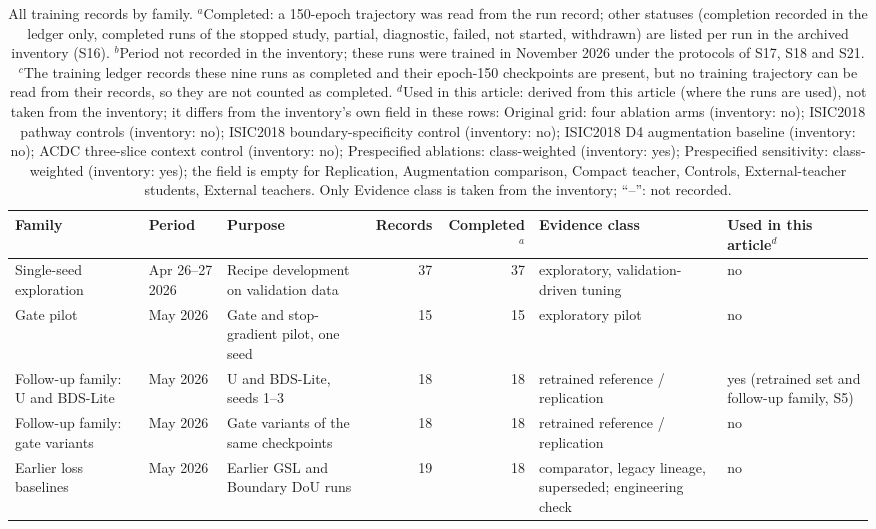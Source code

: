 \begin{longtable}{@{}p{3.0cm}p{1.5cm}p{3.6cm}rrp{2.8cm}p{2.3cm}@{}}
\caption{\label{tab:inventory}All training records by family. $^{a}$Completed: a 150-epoch trajectory was read from the run record; other statuses (completion recorded in the ledger only, completed runs of the stopped study, partial, diagnostic, failed, not started, withdrawn) are listed per run in the archived inventory (S16). $^{b}$Period not recorded in the inventory; these runs were trained in November 2026 under the protocols of S17, S18 and S21. $^{c}$The training ledger records these nine runs as completed and their epoch-150 checkpoints are present, but no training trajectory can be read from their records, so they are not counted as completed. $^{d}$Used in this article: derived from this article (where the runs are used), not taken from the inventory; it differs from the inventory's own field in these rows: Original grid: four ablation arms (inventory: no); ISIC2018 pathway controls (inventory: no); ISIC2018 boundary-specificity control (inventory: no); ISIC2018 D4 augmentation baseline (inventory: no); ACDC three-slice context control (inventory: no); Prespecified ablations: class-weighted (inventory: yes); Prespecified sensitivity: class-weighted (inventory: yes); the field is empty for Replication, Augmentation comparison, Compact teacher, Controls, External-teacher students, External teachers. Only Evidence class is taken from the inventory; ``--'': not recorded.}\\
\toprule
Family & Period & Purpose & Records & Completed$^{a}$ & Evidence class & Used in this article$^{d}$ \\
\midrule
\endhead
Single-seed exploration & Apr 26--27 2026 & Recipe development on validation data & 37 & 37 & exploratory, validation-driven tuning & no \\
Gate pilot & May 2026 & Gate and stop-gradient pilot, one seed & 15 & 15 & exploratory pilot & no \\
Follow-up family: U and BDS-Lite & May 2026 & U and BDS-Lite, seeds 1--3 & 18 & 18 & retrained reference / replication & yes (retrained set and follow-up family, S5) \\
Follow-up family: gate variants & May 2026 & Gate variants of the same checkpoints & 18 & 18 & retrained reference / replication & no \\
Earlier loss baselines & May 2026 & Earlier GSL and Boundary DoU runs & 19 & 18 & comparator, legacy lineage, superseded; engineering check & no \\

\end{longtable}
